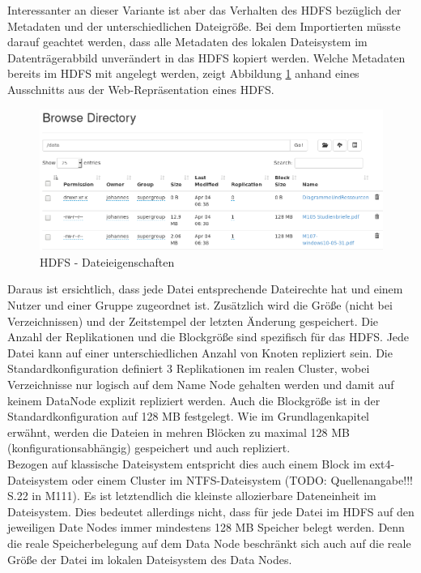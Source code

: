 \noindent
Interessanter an dieser Variante ist aber das Verhalten des HDFS bezüglich der Metadaten und der unterschiedlichen Dateigröße. Bei dem Importierten müsste darauf geachtet werden, dass alle Metadaten des lokalen Dateisystem im Datenträgerabbild unverändert in das HDFS kopiert werden. 
Welche Metadaten bereits im HDFS mit angelegt werden, zeigt Abbildung \ref{fig:hdfs_file_properties} anhand eines Ausschnitts aus der Web-Repräsentation eines HDFS.\\
\begin{figure}[ht]
  \centering
  \includegraphics[width=\textwidth]{./resource/HDFS_FS_Example.png}
  \caption{HDFS - Dateieigenschaften}
  \label{fig:hdfs_file_properties}
\end{figure}

\noindent
Daraus ist ersichtlich, dass jede Datei entsprechende Dateirechte hat und einem Nutzer und einer Gruppe zugeordnet ist. Zusätzlich wird die Größe (nicht bei Verzeichnissen) und der Zeitstempel der letzten Änderung gespeichert. Die Anzahl der Replikationen und die Blockgröße sind spezifisch für das HDFS. Jede Datei kann auf einer unterschiedlichen Anzahl von Knoten repliziert sein. Die Standardkonfiguration definiert 3 Replikationen im realen Cluster, wobei Verzeichnisse nur logisch auf dem Name Node gehalten werden und damit auf keinem DataNode explizit repliziert werden. Auch die Blockgröße ist in der Standardkonfiguration auf 128 MB festgelegt. Wie im Grundlagenkapitel erwähnt, werden die Dateien in mehren Blöcken zu maximal 128 MB (konfigurationsabhängig) gespeichert und auch repliziert.\\ Bezogen auf klassische Dateisystem entspricht dies auch einem Block im ext4-Dateisystem oder einem Cluster im NTFS-Dateisystem (TODO: Quellenangabe!!! S.22 in M111). Es ist letztendlich die kleinste allozierbare Dateneinheit im Dateisystem. Dies bedeutet allerdings nicht, dass für jede Datei im HDFS auf den jeweiligen Date Nodes immer mindestens 128 MB Speicher belegt werden. Denn die reale Speicherbelegung auf dem Data Node beschränkt sich auch auf die reale Größe der Datei im lokalen Dateisystem des Data Nodes.\\

